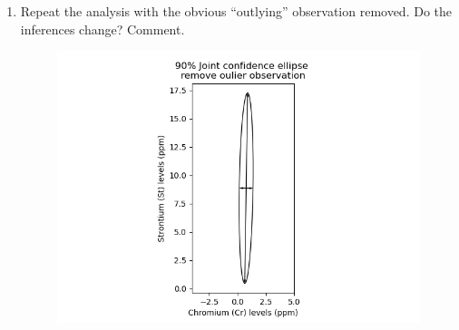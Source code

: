 \begin{enumerate}[label=(\alph*)]
    \item Repeat the analysis with the obvious ``outlying'' observation removed. Do the inferences
    change? Comment.
    \begin{figure}[H]
        \centering
        \includegraphics[scale=0.75]{./python/chapter-5/Question-5-11-d-CI-Ellipse.png}
    \end{figure}


\end{enumerate}
